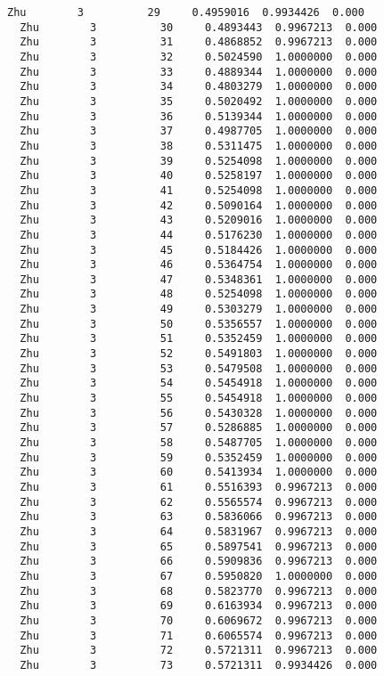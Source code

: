 \documentclass[11pt]{article}
\begin{document}
\begin{Verbatim}[commandchars=\\\{\}]
  Zhu        3          29     0.4959016  0.9934426  0.000
  Zhu        3          30     0.4893443  0.9967213  0.000
  Zhu        3          31     0.4868852  0.9967213  0.000
  Zhu        3          32     0.5024590  1.0000000  0.000
  Zhu        3          33     0.4889344  1.0000000  0.000
  Zhu        3          34     0.4803279  1.0000000  0.000
  Zhu        3          35     0.5020492  1.0000000  0.000
  Zhu        3          36     0.5139344  1.0000000  0.000
  Zhu        3          37     0.4987705  1.0000000  0.000
  Zhu        3          38     0.5311475  1.0000000  0.000
  Zhu        3          39     0.5254098  1.0000000  0.000
  Zhu        3          40     0.5258197  1.0000000  0.000
  Zhu        3          41     0.5254098  1.0000000  0.000
  Zhu        3          42     0.5090164  1.0000000  0.000
  Zhu        3          43     0.5209016  1.0000000  0.000
  Zhu        3          44     0.5176230  1.0000000  0.000
  Zhu        3          45     0.5184426  1.0000000  0.000
  Zhu        3          46     0.5364754  1.0000000  0.000
  Zhu        3          47     0.5348361  1.0000000  0.000
  Zhu        3          48     0.5254098  1.0000000  0.000
  Zhu        3          49     0.5303279  1.0000000  0.000
  Zhu        3          50     0.5356557  1.0000000  0.000
  Zhu        3          51     0.5352459  1.0000000  0.000
  Zhu        3          52     0.5491803  1.0000000  0.000
  Zhu        3          53     0.5479508  1.0000000  0.000
  Zhu        3          54     0.5454918  1.0000000  0.000
  Zhu        3          55     0.5454918  1.0000000  0.000
  Zhu        3          56     0.5430328  1.0000000  0.000
  Zhu        3          57     0.5286885  1.0000000  0.000
  Zhu        3          58     0.5487705  1.0000000  0.000
  Zhu        3          59     0.5352459  1.0000000  0.000
  Zhu        3          60     0.5413934  1.0000000  0.000
  Zhu        3          61     0.5516393  0.9967213  0.000
  Zhu        3          62     0.5565574  0.9967213  0.000
  Zhu        3          63     0.5836066  0.9967213  0.000
  Zhu        3          64     0.5831967  0.9967213  0.000
  Zhu        3          65     0.5897541  0.9967213  0.000
  Zhu        3          66     0.5909836  0.9967213  0.000
  Zhu        3          67     0.5950820  1.0000000  0.000
  Zhu        3          68     0.5823770  0.9967213  0.000
  Zhu        3          69     0.6163934  0.9967213  0.000
  Zhu        3          70     0.6069672  0.9967213  0.000
  Zhu        3          71     0.6065574  0.9967213  0.000
  Zhu        3          72     0.5721311  0.9967213  0.000
  Zhu        3          73     0.5721311  0.9934426  0.000

\end{Verbatim}
\end{document}
